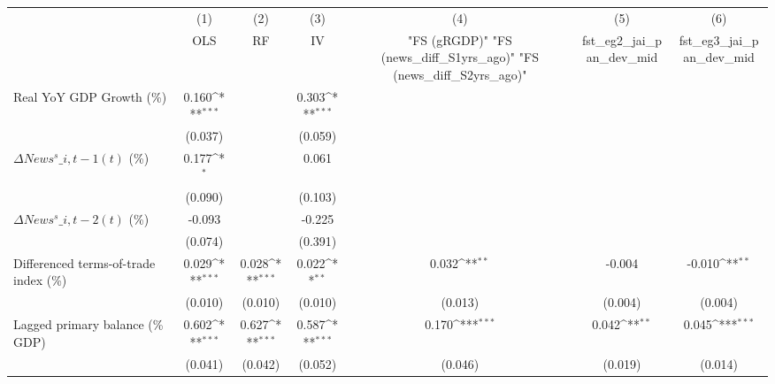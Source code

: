 {
\def\sym#1{\ifmmode^{#1}\else\(^{#1}\)\fi}
\begin{tabular}{l*{6}{c}}
\toprule
                    &\multicolumn{1}{c}{(1)}&\multicolumn{1}{c}{(2)}&\multicolumn{1}{c}{(3)}&\multicolumn{1}{c}{(4)}&\multicolumn{1}{c}{(5)}&\multicolumn{1}{c}{(6)}\\
                    &\multicolumn{1}{c}{OLS}&\multicolumn{1}{c}{RF}&\multicolumn{1}{c}{IV}&\multicolumn{1}{c}{ "FS (gRGDP)"  "FS (news\_diff\_S1yrs\_ago)"  "FS (news\_diff\_S2yrs\_ago)" }&\multicolumn{1}{c}{fst\_eg2\_jai\_pan\_dev\_mid}&\multicolumn{1}{c}{fst\_eg3\_jai\_pan\_dev\_mid}\\
\midrule
Real YoY GDP Growth (\%)&       0.160\sym{***}&                     &       0.303\sym{***}&                     &                     &                     \\
                    &     (0.037)         &                     &     (0.059)         &                     &                     &                     \\
\addlinespace
$ \Delta News^s\_{i,t-1}(t)$ (\%)&       0.177\sym{*}  &                     &       0.061         &                     &                     &                     \\
                    &     (0.090)         &                     &     (0.103)         &                     &                     &                     \\
\addlinespace
$ \Delta News^s\_{i,t-2}(t)$ (\%)&      -0.093         &                     &      -0.225         &                     &                     &                     \\
                    &     (0.074)         &                     &     (0.391)         &                     &                     &                     \\
\addlinespace
Differenced terms-of-trade index (\%)&       0.029\sym{***}&       0.028\sym{***}&       0.022\sym{**} &       0.032\sym{**} &      -0.004         &      -0.010\sym{**} \\
                    &     (0.010)         &     (0.010)         &     (0.010)         &     (0.013)         &     (0.004)         &     (0.004)         \\
\addlinespace
Lagged primary balance (\% GDP)&       0.602\sym{***}&       0.627\sym{***}&       0.587\sym{***}&       0.170\sym{***}&       0.042\sym{**} &       0.045\sym{***}\\
                    &     (0.041)         &     (0.042)         &     (0.052)         &     (0.046)         &     (0.019)         &     (0.014)         \\

\end{tabular}}
